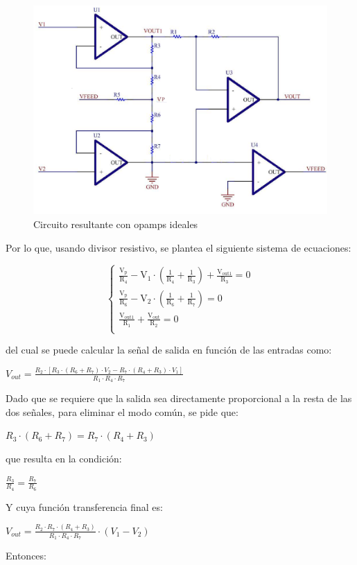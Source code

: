\documentclass[../../tc_tp3_main.tex]{subfiles}
\begin{document}
	\begin{figure}[H]	
		\centering
		\includegraphics[scale=0.4]{imagenes/circuito_ideal.png}
		\caption{Circuito resultante con opamps ideales}
		\label{fig:ej3_circuito_ideal}
	\end{figure}
Por lo que, usando divisor resistivo, se plantea el siguiente sistema de ecuaciones: \par

 	\begin{equation}
  	   \left\{
	  	    \begin{array}{ll}
		 					\mathrm{\frac{V_p}{R_4} - V_1\cdot (\frac{1}{R_4} + \frac{1}{R_3}) + \frac{V_{out1}}{R_3} = 0 } \\
			 				\mathrm{\frac{V_p}{R_6} - V_2\cdot (\frac{1}{R_6} + \frac{1}{R_7}) = 0 } \\
			 				\mathrm{\frac{V_{out1}}{R_1} + \frac{V_{out}}{R_2} = 0 } \\
	     	 \end{array}
	     	\right.
 	\end{equation}
 	
del cual se puede calcular la señal de salida en función de las entradas como: \par

$V_{out} = \frac{R_2\cdot [R_3\cdot (R_6 + R_7) \cdot V_2 -R_7\cdot (R_4 + R_3)\cdot V_1]}{R_1\cdot R_4\cdot R_7}$

Dado que se requiere que la salida sea directamente proporcional a la resta de las dos señales, para eliminar el modo común, se pide que:\par
\begin{centering}
$R_3\cdot (R_6 + R_7) = R_7\cdot (R_4 + R_3)$\par
\end{centering}
que resulta en la condición: \par
\begin{centering}
$\frac{R_3}{R_4} = \frac{R_7}{R_6}$\par
\end{centering}
Y cuya función transferencia final es: \par
$V_{out} = \frac{R_2\cdot R_7\cdot (R_4 + R_3)}{R_1\cdot R_4 \cdot R_7}\cdot (V_1 - V_2)$\par
Entonces: \par
\end{document}
